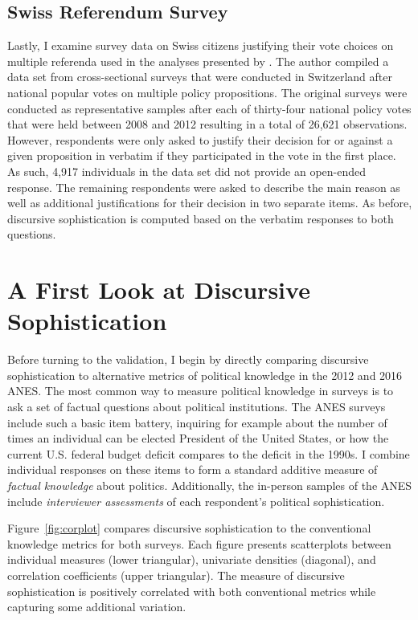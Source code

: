 \subsection{Swiss Referendum Survey}
Lastly, I examine survey data on Swiss citizens justifying their vote choices on multiple referenda used in the analyses presented by \citet{colombo2016justifications}. The author compiled a data set from cross-sectional surveys that were conducted in Switzerland after national popular votes on multiple policy propositions. The original surveys were conducted as representative samples after each of thirty-four national policy votes that were held between 2008 and 2012 resulting in a total of 26,621 observations. However, respondents were only asked to justify their decision for or against a given proposition in verbatim if they participated in the vote in the first place. As such, 4,917 individuals in the data set did not provide an open-ended response. The remaining respondents were asked to describe the main reason as well as additional justifications for their decision in two separate items. As before, discursive sophistication is computed based on the verbatim responses to both questions.



\section{A First Look at Discursive Sophistication}

Before turning to the validation, I begin by directly comparing discursive sophistication to alternative metrics of political knowledge in the 2012 and 2016 ANES. The most common way to measure political knowledge in surveys is to ask a set of factual questions about political institutions. The ANES surveys include such a basic item battery, inquiring for example about the number of times an individual can be elected President of the United States, or how the current U.S. federal budget deficit compares to the deficit in the 1990s. I combine individual responses on these items to form a standard additive measure of \textit{factual knowledge} about politics. Additionally, the in-person samples of the ANES include \textit{interviewer assessments} of each respondent's political sophistication.

Figure~\ref{fig:corplot} compares discursive sophistication to the conventional knowledge metrics for both surveys. Each figure presents scatterplots between individual measures (lower triangular), univariate densities (diagonal), and correlation coefficients (upper triangular). The measure of discursive sophistication is positively correlated with both conventional metrics while capturing some additional variation.

